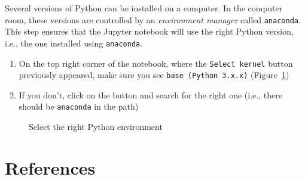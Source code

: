 \documentclass[
  letterpaper,
  DIV=11,
  numbers=noendperiod]{scrreprt}
\providecommand{\tightlist}{%
  \setlength{\itemsep}{0pt}\setlength{\parskip}{0pt}}\usepackage{longtable,booktabs,array}
\newlength{\cslhangindent}
\newenvironment{CSLReferences}[2] %
 {\begin{list}{}{%
  \setlength{\itemindent}{0pt}
  \setlength{\leftmargin}{0pt}
  \setlength{\parsep}{0pt}
  \ifodd #1
   \setlength{\leftmargin}{\cslhangindent}
   \setlength{\itemindent}{-1\cslhangindent}
  \fi
  \setlength{\itemsep}{#2\baselineskip}}}
 {\end{list}}
\begin{document}

Several versions of Python can be installed on a computer. In the
computer room, these versions are controlled by an \emph{environment
manager} called \texttt{anaconda}. This step ensures that the Jupyter
notebook will use the right Python version, i.e., the one installed
using \texttt{anaconda}.

\begin{enumerate}
\def\labelenumi{\arabic{enumi}.}
\tightlist
\item
  On the top right corner of the notebook, where the
  \texttt{Select\ kernel} button previously appeared, make sure you see
  \texttt{base\ (Python\ 3.x.x)} (Figure~\ref{fig-env})
\item
  If you don't, click on the button and search for the right one (i.e.,
  there should be \texttt{anaconda} in the path)
\end{enumerate}

\begin{figure}


\caption{\label{fig-env}Select the right Python environment}

\end{figure}%


\chapter*{References}\label{references}


\label{refs}
\begin{CSLReferences}{0}{1}
\end{CSLReferences}
\end{document}
